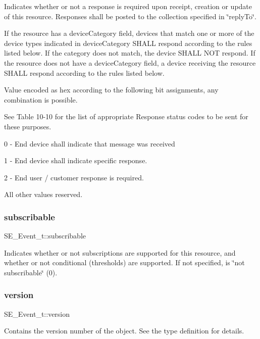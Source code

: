 Indicates whether or not a response is required upon receipt, creation or update of this resource. Responses shall be posted to the collection specified in \char`\"{}reply\+To\char`\"{}.

If the resource has a device\+Category field, devices that match one or more of the device types indicated in device\+Category S\+H\+A\+LL respond according to the rules listed below. If the category does not match, the device S\+H\+A\+LL N\+OT respond. If the resource does not have a device\+Category field, a device receiving the resource S\+H\+A\+LL respond according to the rules listed below.

Value encoded as hex according to the following bit assignments, any combination is possible.

See Table 10-\/10 for the list of appropriate Response status codes to be sent for these purposes.

0 -\/ End device shall indicate that message was received

1 -\/ End device shall indicate specific response.

2 -\/ End user / customer response is required.

All other values reserved. \mbox{\label{group__Event_ga39e93713a0f72e98d013681430dbea2b}} 
\subsubsection{\texorpdfstring{subscribable}{subscribable}}
{\footnotesize\ttfamily S\+E\+\_\+\+Event\+\_\+t\+::subscribable}

Indicates whether or not subscriptions are supported for this resource, and whether or not conditional (thresholds) are supported. If not specified, is \char`\"{}not subscribable\char`\"{} (0). \mbox{\label{group__Event_ga2e534e84cddb42f9ac5e30cac9852117}} 
\subsubsection{\texorpdfstring{version}{version}}
{\footnotesize\ttfamily S\+E\+\_\+\+Event\+\_\+t\+::version}

Contains the version number of the object. See the type definition for details. 